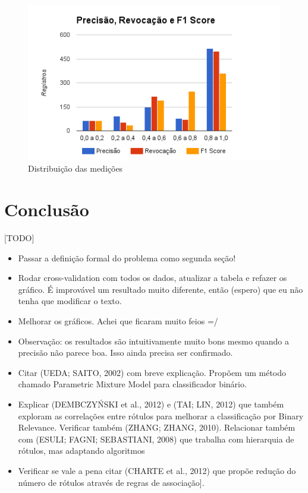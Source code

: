 \documentclass[runningheads,a4paper]{llncs}
\begin{document}
\begin{figure}
	\includegraphics[scale=0.7]{medicoes}
	\caption{Distribuição das medições}
	\label{fig:medicoes}
\end{figure}


\section{Conclusão} \label{sec:conclusao}

[TODO]
\begin{itemize}
	\item Passar a definição formal do problema como segunda seção!
	\item Rodar cross-validation com todos os dados, atualizar a tabela e refazer os gráfico. É improvável um resultado muito diferente, então (espero) que eu não tenha que modificar o texto.
	\item Melhorar os gráficos. Achei que ficaram muito feios =/
	\item Observação: os resultados são intuitivamente muito bons mesmo quando a precisão não parece boa. Isso ainda precisa ser confirmado.
	\item Citar (UEDA; SAITO, 2002) com breve explicação. Propõem um método chamado Parametric Mixture Model para classificador binário.
	\item Explicar (DEMBCZYŃSKI et al., 2012) e (TAI; LIN, 2012) que também exploram as correlações entre rótulos para melhorar a classificação por Binary Relevance. Verificar também (ZHANG; ZHANG, 2010). Relacionar também com (ESULI; FAGNI; SEBASTIANI, 2008) que trabalha com hierarquia de rótulos, mas adaptando algoritmos
	\item Verificar se vale a pena citar (CHARTE et al., 2012) que propõe redução do número de rótulos através de regras de associação].
\end{itemize}



\end{document}
